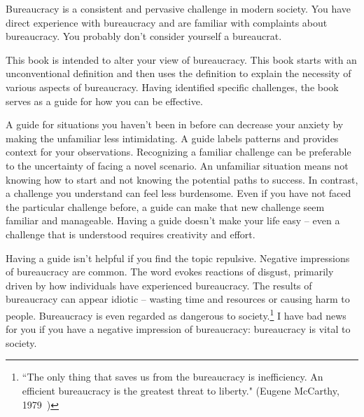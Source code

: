 

Bureaucracy is a consistent and pervasive challenge in modern society. You have direct experience with bureaucracy and are familiar with complaints about bureaucracy. You probably don't consider yourself a bureaucrat.

This book is intended to alter your view of bureaucracy. This book starts with an unconventional definition and then uses the definition to explain the necessity of various aspects of bureaucracy. Having identified specific challenges, the book serves as a guide for how you can be effective. 

A guide for situations you haven't been in before can decrease your anxiety by making the unfamiliar less intimidating. 
A guide labels patterns and provides context for your observations. 
Recognizing a familiar challenge can be preferable to the uncertainty of facing a novel scenario. An unfamiliar situation means not knowing how to start and not knowing the potential paths to success. In contrast, a challenge you understand can feel less burdensome. 
Even if you have not faced the particular challenge before, a guide can make that new challenge seem familiar and manageable. 
Having a guide doesn't make your life easy -- even a challenge that is understood requires creativity and effort.


Having a guide isn't helpful if you find the topic repulsive.
Negative impressions of bureaucracy are common. The word
evokes reactions of disgust, primarily driven by how individuals have experienced bureaucracy.
The results of bureaucracy can appear idiotic -- 
wasting time and resources or causing harm to people.
Bureaucracy is even regarded as dangerous to society.\footnote{``The only thing that saves us from the bureaucracy is inefficiency. An efficient bureaucracy is the greatest threat to liberty." (Eugene McCarthy, 1979~\cite{1979_McCarthy})}
I have bad news for you if you have a negative impression of bureaucracy: bureaucracy is vital to society. 

